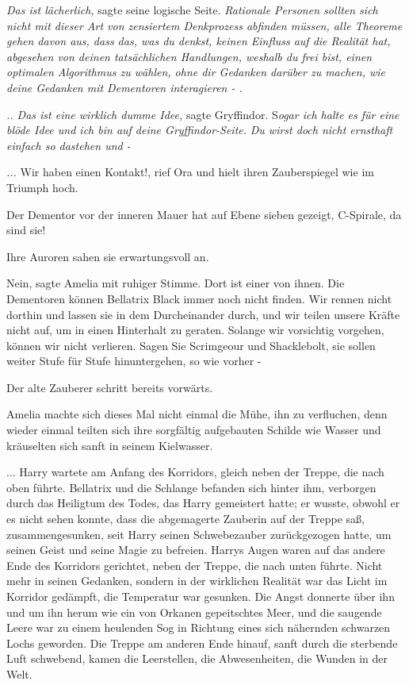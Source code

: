 \emph{Das ist lächerlich,} sagte seine logische Seite. \emph{Rationale Personen
sollten sich nicht mit dieser Art von zensiertem Denkprozess abfinden müssen,
alle Theoreme gehen davon aus, dass das, was du denkst, keinen Einfluss auf die
Realität hat, abgesehen von deinen tatsächlichen Handlungen, weshalb du frei
bist, einen optimalen Algorithmus zu wählen, ohne dir Gedanken darüber zu
machen, wie deine Gedanken mit Dementoren interagieren - .}

\emph{.. Das ist eine wirklich dumme Idee,} sagte Gryffindor. S\emph{ogar ich
halte es für eine} \emph{blöde Idee und ich bin auf deine Gryffindor-Seite.}
\emph{Du wirst doch nicht ernsthaft einfach so dastehen und -}

\emph{...}
\glqq{}Wir haben einen Kontakt!\grqq{}, rief Ora und hielt ihren Zauberspiegel
wie im Triumph hoch.

\glqq{}Der Dementor vor der inneren Mauer hat auf Ebene sieben gezeigt,
C-Spirale, da sind sie!\grqq{}

Ihre Auroren sahen sie erwartungsvoll an.

\glqq{}Nein\grqq{}, sagte Amelia mit ruhiger Stimme. \glqq{}Dort ist einer von
ihnen. Die Dementoren können Bellatrix Black immer noch nicht finden. Wir rennen
nicht dorthin und lassen sie in dem Durcheinander durch, und wir teilen unsere
Kräfte nicht auf, um in einen Hinterhalt zu geraten. Solange wir vorsichtig
vorgehen, können wir nicht verlieren. Sagen Sie Scrimgeour und Shacklebolt, sie
sollen weiter Stufe für Stufe hinuntergehen, so wie vorher -\grqq{}

Der alte Zauberer schritt bereits vorwärts.

Amelia machte sich dieses Mal nicht einmal die Mühe, ihn zu verfluchen, denn
wieder einmal teilten sich ihre sorgfältig aufgebauten Schilde wie Wasser und
kräuselten sich sanft in seinem Kielwasser.

... Harry wartete am Anfang des Korridors, gleich neben der Treppe, die nach
oben führte. Bellatrix und die Schlange befanden sich hinter ihm, verborgen
durch das Heiligtum des Todes, das Harry gemeistert hatte; er wusste, obwohl er
es nicht sehen konnte, dass die abgemagerte Zauberin auf der Treppe saß,
zusammengesunken, seit Harry seinen Schwebezauber zurückgezogen hatte, um seinen
Geist und seine Magie zu befreien. Harrys Augen waren auf das andere Ende des
Korridors gerichtet, neben der Treppe, die nach unten führte. Nicht mehr in
seinen Gedanken, sondern in der wirklichen Realität war das Licht im Korridor
gedämpft, die Temperatur war gesunken. Die Angst donnerte über ihn und um ihn
herum wie ein von Orkanen gepeitschtes Meer, und die saugende Leere war zu einem
heulenden Sog in Richtung eines sich nähernden schwarzen Lochs geworden. Die
Treppe am anderen Ende hinauf, sanft durch die sterbende Luft schwebend, kamen
die Leerstellen, die Abwesenheiten, die Wunden in der Welt.

